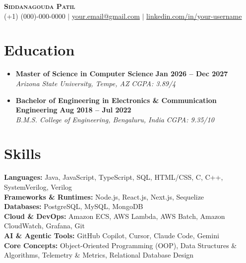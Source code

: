 \documentclass[letterpaper,11pt]{article}
\newcommand{\resumeSubheading}[4]{
  \vspace{-2pt}\item
    \textbf{#1} \hfill \textbf{\small #2} \\
    \textit{\small#3} \hfill \textit{\small #4} \vspace{-7pt}
}
\newcommand{\resumeSubHeadingListStart}{\begin{itemize}[leftmargin=0.0in, label={}]}
\newcommand{\resumeSubHeadingListEnd}{\end{itemize}}
\begin{document}
\begin{center}
    \textbf{\Large \scshape Siddanagouda Patil} \\ \vspace{1pt}
    \small (+1) (000)-000-0000 $|$ \href{mailto:your.email@gmail.com}{{your.email@gmail.com}} $|$ 
    \href{https://www.linkedin.com/in/your-username/}{\underline{linkedin.com/in/your-username}}
 \vspace{-12pt}  
\end{center}


\section{Education}
  \resumeSubHeadingListStart
    \resumeSubheading
      {Master of Science in Computer Science}{Jan 2026 -- Dec 2027}
      {Arizona State University, Tempe, AZ}{CGPA: 3.89/4} \\ \vspace{8pt}
    \resumeSubheading
      {Bachelor of Engineering in Electronics \& Communication Engineering}{Aug 2018 -- Jul 2022}
      {B.M.S. College of Engineering, Bengaluru, India}{CGPA: 9.35/10}
  \resumeSubHeadingListEnd


\section{Skills}
 \vspace{-2pt}
 \begin{itemize}[leftmargin=0.15in, label={}]
    \small{\item{
     \textbf{Languages: }{Java, JavaScript, TypeScript, SQL, HTML/CSS, C, C++, SystemVerilog, Verilog} \\
     \textbf{Frameworks \& Runtimes: }{Node.js, React.js, Next.js, Sequelize} \\
     \textbf{Databases: }{PostgreSQL, MySQL, MongoDB} \\
     \textbf{Cloud \& DevOps: }{Amazon ECS, AWS Lambda, AWS Batch, Amazon CloudWatch, Grafana, Git} \\
     \textbf{AI \& Agentic Tools: }{GitHub Copilot, Cursor, Claude Code, Gemini} \\
     \textbf{Core Concepts: }{Object-Oriented Programming (OOP), Data Structures \& Algorithms, Telemetry \& Metrics, Relational Database Design}
    }}
 \end{itemize}
  \vspace{-14pt}  
\end{document}
